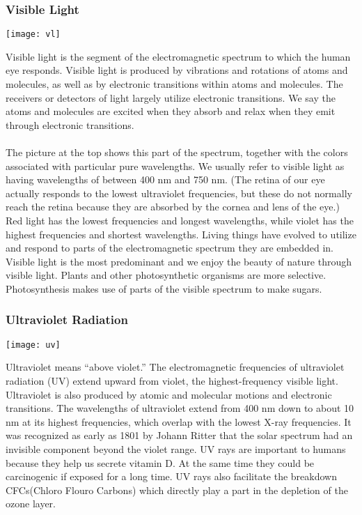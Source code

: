 \documentclass[11pt]{article}
\begin{document}
	\subsubsection*{Visible Light}
	\begin{center}
		\texttt{[image: vl]}
	\end{center}
	Visible light is the segment of the electromagnetic spectrum to which the human eye responds. Visible light is produced by vibrations and rotations of atoms and molecules, as well as by electronic transitions within atoms and molecules. The receivers or detectors of light largely utilize electronic transitions. We say the atoms and molecules are excited when they absorb and relax when they emit through electronic transitions. \\ \\
	The picture at the top shows this part of the spectrum, together with the colors associated with particular pure wavelengths. We usually refer to visible light as having wavelengths of between 400 nm and 750 nm. (The retina of our eye actually responds to the lowest ultraviolet frequencies, but these do not normally reach the retina because they are absorbed by the cornea and lens of the eye.) Red light has the lowest frequencies and longest wavelengths, while violet has the highest frequencies and shortest wavelengths. 
	Living things have evolved to utilize and respond to parts of the electromagnetic spectrum they are embedded in. Visible light is the most predominant and we enjoy the beauty of nature through visible light. Plants and other photosynthetic organisms are more selective. Photosynthesis makes use of parts of the visible spectrum to make sugars.
	\subsubsection*{Ultraviolet Radiation}
	\begin{center}
		\texttt{[image: uv]}
	\end{center}
	Ultraviolet means “above violet.” The electromagnetic frequencies of ultraviolet radiation (UV) extend upward from violet, the highest-frequency visible light. Ultraviolet is also produced by atomic and molecular motions and electronic transitions. The wavelengths of ultraviolet extend from 400 nm down to about 10 nm at its highest frequencies, which overlap with the lowest X-ray frequencies. It was recognized as early as 1801 by Johann Ritter that the solar spectrum had an invisible component beyond the violet range. UV rays are important to humans because they help us secrete vitamin D. At the same time they could be carcinogenic if exposed for a long time. UV rays also facilitate the breakdown CFCs(Chloro Flouro Carbons) which directly play a part in the depletion of the ozone layer.
\end{document}
